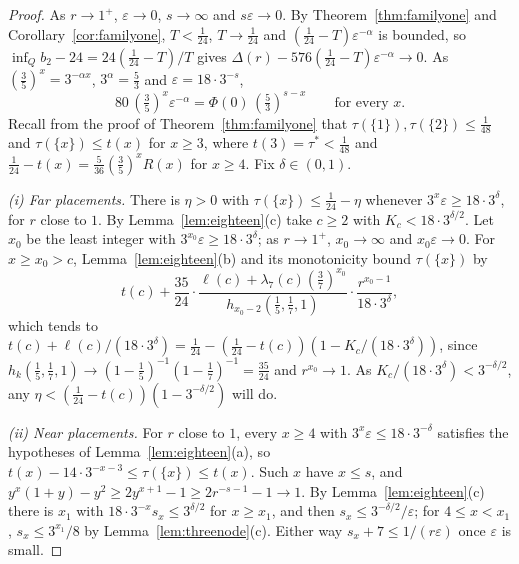 \documentclass[11pt]{article}
\begin{document}
\begin{proof}
As $r\to1^+$, $\varepsilon\to0$, $s\to\infty$ and $s\varepsilon\to0$.  By
Theorem~\ref{thm:familyone} and Corollary~\ref{cor:familyone}, $T<\tfrac1{24}$,
$T\to\tfrac1{24}$ and $(\tfrac1{24}-T)\varepsilon^{-\alpha}$ is bounded, so
$\inf_Qb_2-24=24(\tfrac1{24}-T)/T$ gives
$\Delta(r)-576(\tfrac1{24}-T)\varepsilon^{-\alpha}\to0$.  As
$(\tfrac35)^x=3^{-\alpha x}$, $3^\alpha=\tfrac53$ and
$\varepsilon=18\cdot3^{-s}$,
\begin{equation}\label{eq:oscscale}
  80\,(\tfrac35)^x\varepsilon^{-\alpha}=\Phi(0)\,(\tfrac53)^{s-x}
  \qquad\text{for every }x .
\end{equation}
Recall from the proof of Theorem~\ref{thm:familyone} that
$\tau(\{1\}),\tau(\{2\})\le\tfrac1{48}$ and $\tau(\{x\})\le t(x)$ for
$x\ge3$, where $t(3)=\tau^*<\tfrac1{48}$ and
$\tfrac1{24}-t(x)=\tfrac5{36}(\tfrac35)^xR(x)$ for $x\ge4$.  Fix
$\delta\in(0,1)$.

\emph{(i) Far placements.}  There is $\eta>0$ with
$\tau(\{x\})\le\tfrac1{24}-\eta$ whenever $3^x\varepsilon\ge18\cdot3^\delta$,
for $r$ close to $1$.  By Lemma~\ref{lem:eighteen}(c) take $c\ge2$ with
$K_c<18\cdot3^{\delta/2}$.  Let $x_0$ be the least integer with
$3^{x_0}\varepsilon\ge18\cdot3^\delta$; as $r\to1^+$, $x_0\to\infty$ and
$x_0\varepsilon\to0$.  For $x\ge x_0>c$, Lemma~\ref{lem:eighteen}(b) and its
monotonicity bound $\tau(\{x\})$ by
\[
  t(c)+\frac{35}{24}\cdot
  \frac{\ell(c)+\lambda_7(c)(\tfrac37)^{x_0}}{h_{x_0-2}(\tfrac15,\tfrac17,1)}
  \cdot\frac{r^{x_0-1}}{18\cdot3^\delta},
\]
which tends to $t(c)+\ell(c)/(18\cdot3^\delta)
=\tfrac1{24}-(\tfrac1{24}-t(c))(1-K_c/(18\cdot3^\delta))$, since
$h_k(\tfrac15,\tfrac17,1)\to(1-\tfrac15)^{-1}(1-\tfrac17)^{-1}=\tfrac{35}{24}$
and $r^{x_0}\to1$.  As $K_c/(18\cdot3^\delta)<3^{-\delta/2}$, any
$\eta<(\tfrac1{24}-t(c))(1-3^{-\delta/2})$ will do.

\emph{(ii) Near placements.}  For $r$ close to $1$, every $x\ge4$ with
$3^x\varepsilon\le18\cdot3^{-\delta}$ satisfies the hypotheses of
Lemma~\ref{lem:eighteen}(a), so
$t(x)-14\cdot3^{-x-3}\le\tau(\{x\})\le t(x)$.  Such $x$ have $x\le s$, and
$y^x(1+y)-y^2\ge2y^{x+1}-1\ge2r^{-s-1}-1\to1$.  By
Lemma~\ref{lem:eighteen}(c) there is $x_1$ with
$18\cdot3^{-x}s_x\le3^{\delta/2}$ for $x\ge x_1$, and then
$s_x\le3^{-\delta/2}/\varepsilon$; for $4\le x<x_1$,
$s_x\le3^{x_1}/8$ by Lemma~\ref{lem:threenode}(c).  Either way
$s_x+7\le1/(r\varepsilon)$ once $\varepsilon$ is small.


\end{proof}
\end{document}
